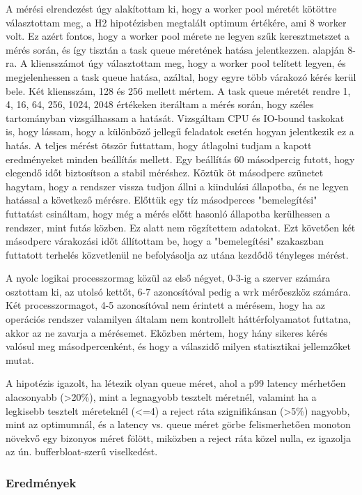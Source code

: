 \documentclass[11pt,a4paper]{article}
\begin{document}
A mérési elrendezést úgy alakítottam ki, hogy a worker pool méretét kötöttre választottam meg, a H2 hipotézisben megtalált optimum értékére, ami 8 worker volt. Ez azért fontos, hogy a worker pool mérete ne legyen szűk keresztmetszet a mérés során, és így tisztán a task queue méretének hatása jelentkezzen.
alapján 8-ra. A kliensszámot úgy választottam meg, hogy a worker pool telített legyen, és megjelenhessen a task queue hatása, azáltal,
hogy egyre több várakozó kérés kerül bele. Két kliensszám, 128 és 256 mellett mértem.
A task queue méretét rendre 1, 4, 16, 64, 256, 1024, 2048 értékeken iteráltam a mérés során, hogy széles tartományban vizsgálhassam a hatását.
Vizsgáltam CPU és IO-bound taskokat is, hogy lássam, hogy a különböző jellegű feladatok esetén hogyan jelentkezik ez a hatás.
A teljes mérést ötször futtattam, hogy átlagolni tudjam a kapott eredményeket minden beállítás mellett.
Egy beállítás 60 másodpercig futott, hogy elegendő időt biztosítson a stabil méréshez.
Köztük öt másodperc szünetet hagytam, hogy a rendszer vissza tudjon állni a kiindulási állapotba, és ne legyen hatással a következő mérésre.
Előttük egy tíz másodperces "bemelegítési" futtatást csináltam, hogy még a mérés előtt hasonló állapotba kerülhessen a rendszer,
mint futás közben. Ez alatt nem rögzítettem adatokat.
Ezt követően két másodperc várakozási időt állítottam be, hogy a "bemelegítési" szakaszban futtatott terhelés közvetlenül ne befolyásolja
az utána kezdődő tényleges mérést.

A nyolc logikai processzormag közül az első négyet, 0-3-ig a szerver számára osztottam ki, az utolsó kettőt, 6-7 azonosítóval 
pedig a wrk mérőeszköz számára. Két processzormagot, 4-5 azonosítóval nem érintett a mérésem, hogy ha az operációs rendszer
valamilyen általam nem kontrollelt háttérfolyamatot futtatna, akkor az ne zavarja a mérésemet.
Eközben mértem, hogy hány sikeres kérés valósul meg másodpercenként, és hogy a válaszidő milyen statisztikai jellemzőket mutat.


A hipotézis igazolt, ha létezik olyan queue méret, ahol a p99 latency mérhetően alacsonyabb (>20\%), mint a legnagyobb tesztelt méretnél, valamint
ha a legkisebb tesztelt méreteknél (<=4) a reject ráta szignifikánsan (>5\%) nagyobb, mint az optimumnál, és
a latency vs. queue méret görbe felismerhetően monoton növekvő egy bizonyos méret fölött, miközben a reject ráta közel nulla, ez igazolja az ún. bufferbloat-szerű viselkedést.




\subsubsection{Eredmények}
\label{sssec:h3-eredmenyek}
\end{document}
